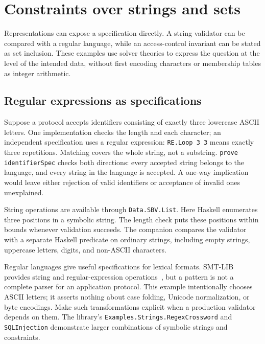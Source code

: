 \documentclass[review]{jfp-epi}
\newcommand{\code}[1]{\texttt{#1}}
\begin{document}
\section{Constraints over strings and sets}
\label{sec:strings-and-sets}

Representations can expose a specification directly. A string validator can be
compared with a regular language, while an access-control invariant can be
stated as set inclusion. These examples use solver theories to express the
question at the level of the intended data, without first encoding characters
or membership tables as integer arithmetic.


\subsection{Regular expressions as specifications}
\label{sec:strings-regex}

Suppose a protocol accepts identifiers consisting of exactly three lowercase
ASCII letters. One implementation checks the length and each character; an
independent specification uses a regular expression:
\code{RE.Loop 3 3} means exactly three repetitions. Matching covers the whole
string, not a substring. \code{prove identifierSpec} checks both directions:
every accepted string belongs to the language, and every string in the language
is accepted. A one-way implication would leave either rejection of valid
identifiers or acceptance of invalid ones unexplained.

String operations are available through \code{Data.SBV.List}. Here Haskell
enumerates three positions in a symbolic string. The length check puts these
positions within bounds whenever validation succeeds. The companion compares
the validator with a separate Haskell predicate on ordinary strings, including
empty strings, uppercase letters, digits, and non-ASCII characters.

Regular languages give useful specifications for lexical formats. SMT-LIB
provides string and regular-expression operations~\citep{smtstrings}, but a
pattern is not a complete parser for an application protocol. This example
intentionally chooses ASCII letters; it asserts nothing about case folding,
Unicode normalization, or byte encodings. Make such transformations explicit
when a production validator depends on them. The library's
\code{Examples.Strings.RegexCrossword} and \code{SQLInjection} demonstrate
larger combinations of symbolic strings and constraints.
\end{document}

